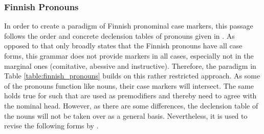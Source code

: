 \documentclass[11pt,a4paper,twoside,openright]{scrbook}
\begin{document}
\subsubsection{Finnish Pronouns}

In order to create a paradigm of Finnish pronominal case markers, this passage follows the order and concrete declension tables of pronouns given in \citet{karlsson2018finn}. As opposed to \citet{white2008finn} that only broadly states that the Finnish pronouns have all case forms, this grammar does not provide markers in all cases, especially not in the marginal ones (comitative, abessive and instructive). Therefore, the paradigm in Table \ref{table:finnish_pronouns} builds on this rather restricted approach. As some of the pronouns function like nouns, their case markers will intersect. The same holds true for such that are used as premodifiers and thereby need to agree with the nominal head. However, as there are some differences, the declension table of the nouns will not be taken over as a general basis. Nevertheless, it is used to revise the following forms by \citet{karlsson2018finn}. 
\end{document}
